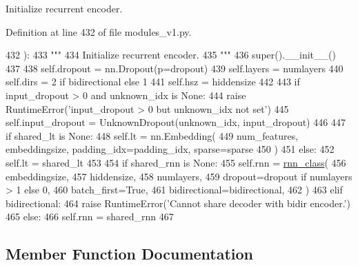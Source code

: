 \begin{DoxyVerb}Initialize recurrent encoder.
\end{DoxyVerb}
 

Definition at line 432 of file modules\+\_\+v1.\+py.


\begin{DoxyCode}
432     ):
433         \textcolor{stringliteral}{"""}
434 \textcolor{stringliteral}{        Initialize recurrent encoder.}
435 \textcolor{stringliteral}{        """}
436         super().\_\_init\_\_()
437 
438         self.dropout = nn.Dropout(p=dropout)
439         self.layers = numlayers
440         self.dirs = 2 \textcolor{keywordflow}{if} bidirectional \textcolor{keywordflow}{else} 1
441         self.hsz = hiddensize
442 
443         \textcolor{keywordflow}{if} input\_dropout > 0 \textcolor{keywordflow}{and} unknown\_idx \textcolor{keywordflow}{is} \textcolor{keywordtype}{None}:
444             \textcolor{keywordflow}{raise} RuntimeError(\textcolor{stringliteral}{'input\_dropout > 0 but unknown\_idx not set'})
445         self.input\_dropout = UnknownDropout(unknown\_idx, input\_dropout)
446 
447         \textcolor{keywordflow}{if} shared\_lt \textcolor{keywordflow}{is} \textcolor{keywordtype}{None}:
448             self.lt = nn.Embedding(
449                 num\_features, embeddingsize, padding\_idx=padding\_idx, sparse=sparse
450             )
451         \textcolor{keywordflow}{else}:
452             self.lt = shared\_lt
453 
454         \textcolor{keywordflow}{if} shared\_rnn \textcolor{keywordflow}{is} \textcolor{keywordtype}{None}:
455             self.rnn = \hyperlink{namespaceseq2seq_1_1train_a46177da1cc74c4a2874e4a527d857f75}{rnn\_class}(
456                 embeddingsize,
457                 hiddensize,
458                 numlayers,
459                 dropout=dropout \textcolor{keywordflow}{if} numlayers > 1 \textcolor{keywordflow}{else} 0,
460                 batch\_first=\textcolor{keyword}{True},
461                 bidirectional=bidirectional,
462             )
463         \textcolor{keywordflow}{elif} bidirectional:
464             \textcolor{keywordflow}{raise} RuntimeError(\textcolor{stringliteral}{'Cannot share decoder with bidir encoder.'})
465         \textcolor{keywordflow}{else}:
466             self.rnn = shared\_rnn
467 
\end{DoxyCode}


\subsection{Member Function Documentation}
\mbox{\label{classparlai_1_1agents_1_1legacy__agents_1_1seq2seq_1_1modules__v1_1_1RNNEncoder_ab9ab650f24d8ba6407261418f480a8f5}} 

